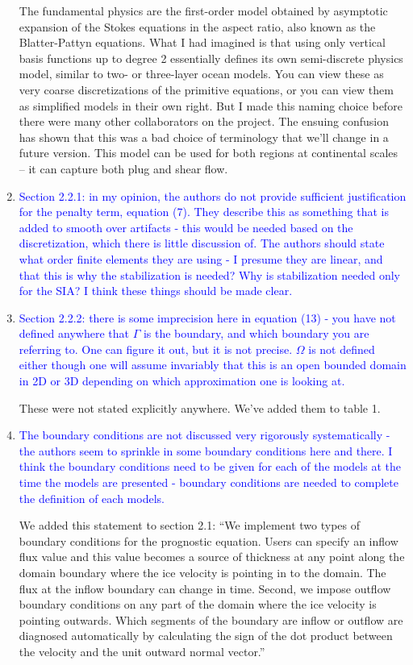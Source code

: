 \documentclass{article}
\theoremstyle{definition}
\theoremstyle{plain}
\begin{document}
\begin{enumerate}
The fundamental physics are the first-order model obtained by asymptotic expansion of the Stokes equations in the aspect ratio, also known as the Blatter-Pattyn equations.
What I had imagined is that using only vertical basis functions up to degree 2 essentially defines its own semi-discrete physics model, similar to two- or three-layer ocean models.
You can view these as very coarse discretizations of the primitive equations, or you can view them as simplified models in their own right.
But I made this naming choice before there were many other collaborators on the project.
The ensuing confusion has shown that this was a bad choice of terminology that we'll change in a future version.
This model can be used for both regions at continental scales -- it can capture both plug and shear flow.

\item \textcolor{blue}{Section 2.2.1: in my opinion, the authors do not provide sufficient justification for the penalty term,
equation (7). They describe this as something that is added to smooth over artifacts - this would be
needed based on the discretization, which there is little discussion of. The authors should state what
order finite elements they are using - I presume they are linear, and that this is why the stabilization
is needed? Why is stabilization needed only for the SIA? I think these things should be made clear.}
\item \textcolor{blue}{Section 2.2.2: there is some imprecision here in equation (13) - you have not defined anywhere that $\Gamma$
is the boundary, and which boundary you are referring to. One can figure it out, but it is not precise.
$\Omega$ is not defined either though one will assume invariably that this is an open bounded domain in 2D
or 3D depending on which approximation one is looking at.}

These were not stated explicitly anywhere.
We've added them to table 1.
\item \textcolor{blue}{The boundary conditions are not discussed very rigorously systematically - the authors seem to
sprinkle in some boundary conditions here and there. I think the boundary conditions need to be
given for each of the models at the time the models are presented - boundary conditions are needed
to complete the definition of each models.}

We added this statement to section 2.1: ``We implement two types of boundary conditions for the prognostic equation.
Users can specify an inflow flux value and this value becomes a source of thickness at any point along the domain boundary where the ice velocity is pointing in to the domain.
The flux at the inflow boundary can change in time.
Second, we impose outflow boundary conditions on any part of the domain where the ice velocity is pointing outwards.
Which segments of the boundary are inflow or outflow are diagnosed automatically by calculating the sign of the dot product between the velocity and the unit outward normal vector.''


\end{enumerate}
\end{document}
